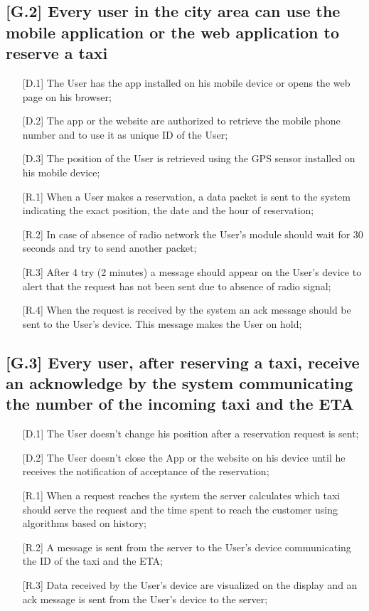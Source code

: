 \documentclass[12pt,a4paper]{book}
\begin{document}
			\subsection{[G.2] Every user in the city area can use the mobile application or the web application to reserve a taxi}
			\begin{itemize}
				\item[\textbullet] [D.1] The User has the app installed on his mobile device or opens the web page on his browser;
				\item[\textbullet] [D.2] The app or the website are authorized to retrieve the mobile phone number and to use it as unique ID of the User;
				\item[\textbullet] [D.3] The position of the User is retrieved using the GPS sensor installed on his mobile device;
				\item[\textbullet] [R.1] When a User makes a reservation, a data packet is sent to the system indicating the exact position, the date and the hour of reservation;
				\item[\textbullet] [R.2] In case of absence of radio network the User's module should wait for 30 seconds and try to send another packet;
				\item[\textbullet] [R.3] After 4 try (2 minutes) a message should appear on the User's device to alert that the request has not been sent due to absence of radio signal;
				\item[\textbullet] [R.4] When the request is received by the system an ack message should be sent to the User's device. This message makes the User on hold;
			\end{itemize}
			\subsection{[G.3] Every user, after reserving a taxi, receive an acknowledge by the system communicating the number of the incoming taxi and the ETA}
			\begin{itemize}
				\item[\textbullet] [D.1] The User doesn't change his position after a reservation request is sent;
				\item[\textbullet] [D.2] The User doesn't close the App or the website on his device until he receives the notification of acceptance of the reservation;
				\item[\textbullet] [R.1] When a request reaches the system the server calculates which taxi should serve the request and the time spent to reach the customer using algorithms based on history;
				\item[\textbullet] [R.2] A message is sent from the server to the User's device communicating the ID of the taxi and the ETA;
				\item[\textbullet] [R.3] Data received by the User's device are visualized on the display and an ack message is sent from the User's device to the server;
			\end{itemize}
\end{document}
